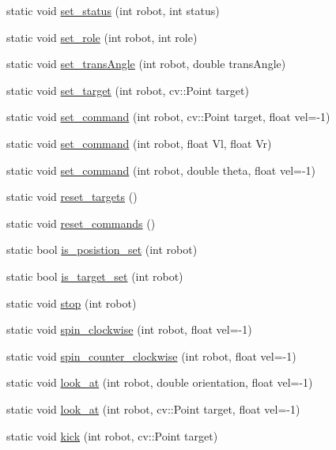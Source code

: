 \begin{DoxyCompactItemize}
static void \hyperlink{class_robots_aa287cd821cfe9c6c65fb5cdfd77c5050}{set\+\_\+status} (int robot, int status)
\item 
static void \hyperlink{class_robots_a3694b6380b113b7c38a252fd3bbfcca3}{set\+\_\+role} (int robot, int role)
\item 
static void \hyperlink{class_robots_ac18c807efc15557ce996563bb76451ea}{set\+\_\+trans\+Angle} (int robot, double trans\+Angle)
\item 
static void \hyperlink{class_robots_ac1cd5c41b6e5d5643b2186ca51699c8f}{set\+\_\+target} (int robot, cv\+::\+Point target)
\item 
static void \hyperlink{class_robots_ae5034abea0160aac1d77ad154ee77f64}{set\+\_\+command} (int robot, cv\+::\+Point target, float vel=-\/1)
\item 
static void \hyperlink{class_robots_a9b22b0778d337d95824a44f52715ff0a}{set\+\_\+command} (int robot, float Vl, float Vr)
\item 
static void \hyperlink{class_robots_a87a5328dac06f74e0bf4113ca575274c}{set\+\_\+command} (int robot, double theta, float vel=-\/1)
\item 
static void \hyperlink{class_robots_ade0caad007f6bbc5cdb35182a16780b7}{reset\+\_\+targets} ()
\item 
static void \hyperlink{class_robots_af9dfd621b03a3c6a52810610abdb6a9d}{reset\+\_\+commands} ()
\item 
static bool \hyperlink{class_robots_ab1028283d9e734acfaa1bfb793a91ada}{is\+\_\+posistion\+\_\+set} (int robot)
\item 
static bool \hyperlink{class_robots_ad79a530bb3c696a351f11f5698fb4960}{is\+\_\+target\+\_\+set} (int robot)
\item 
static void \hyperlink{class_robots_ac3452d86940fa017a16f7be4fe099d89}{stop} (int robot)
\item 
static void \hyperlink{class_robots_a6bd2e21654da3f7c3acc380a2b838240}{spin\+\_\+clockwise} (int robot, float vel=-\/1)
\item 
static void \hyperlink{class_robots_a54c13103d74e172273acf2e56ba5e8fb}{spin\+\_\+counter\+\_\+clockwise} (int robot, float vel=-\/1)
\item 
static void \hyperlink{class_robots_a3b307142c41d7adc7614e6e4f2caf16b}{look\+\_\+at} (int robot, double orientation, float vel=-\/1)
\item 
static void \hyperlink{class_robots_a2359302f0d8cf0701507b2009e58490e}{look\+\_\+at} (int robot, cv\+::\+Point target, float vel=-\/1)
\item 
static void \hyperlink{class_robots_afb5fa179562bd2f6f45c9231c2bbca88}{kick} (int robot, cv\+::\+Point target)
\end{DoxyCompactItemize}
